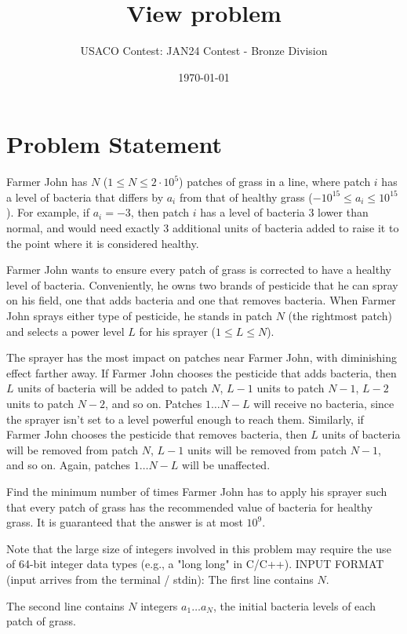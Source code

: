 \documentclass[12pt]{article}
\title{View problem}
\author{USACO Contest: JAN24 Contest - Bronze Division}
\date{\today}
\begin{document}
\maketitle

\section*{Problem Statement}


Farmer John has $N$ ($1\le N\le 2\cdot 10^5$) patches of grass in a line, where
patch $i$ has a level of bacteria that differs by $a_i$ from that of healthy
grass ($-10^{15}\le a_i \le 10^{15}$).  For example, if $a_i = -3$, then patch
$i$ has a level of bacteria 3 lower than normal, and would need exactly 3
additional units of bacteria added to raise it to the point where it is
considered healthy.

Farmer John wants to ensure every patch of grass is corrected to have a healthy
level of bacteria.  Conveniently, he owns two brands of pesticide that he can
spray on his field, one that adds bacteria and one that removes bacteria. When
Farmer John sprays either type of pesticide, he stands in patch $N$ (the
rightmost patch) and selects a power level $L$ for his sprayer ($1 \leq L \leq N$).  

The sprayer has the most impact on patches near Farmer John, with diminishing
effect farther away.  If Farmer John chooses the pesticide that adds bacteria,
then $L$ units of bacteria will be added to patch $N$, $L-1$ units to patch
$N-1$, $L-2$ units to patch $N-2$, and so on.  Patches $1 \ldots N-L$ will
receive no bacteria, since the sprayer isn't set to a level powerful enough to
reach them.   Similarly, if Farmer John chooses the pesticide that removes
bacteria, then $L$ units of bacteria will be removed from patch $N$, $L-1$ units
will be removed from patch $N-1$, and so on.  Again, patches $1 \ldots N-L$ will
be unaffected.

Find the minimum number of times Farmer John has to apply his sprayer such that
every patch of grass has the recommended value of bacteria for healthy grass. It
is guaranteed that the answer is at most $10^9$.

Note that the large size of integers involved in this problem may require the
use of 64-bit integer data types (e.g., a "long long" in C/C++).
INPUT FORMAT (input arrives from the terminal / stdin):
The first line contains $N$.

The second line contains $N$ integers $a_1\dots a_N$, the initial bacteria
levels of each patch of grass.
\end{document}
